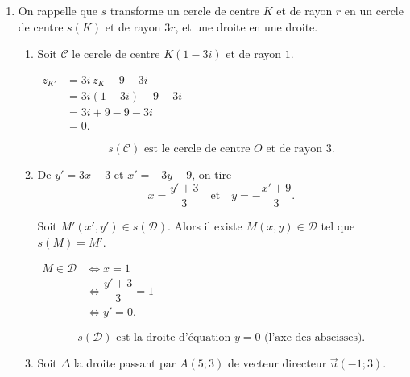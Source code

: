\documentclass[12pt,a4paper]{article}
\begin{document}
\begin{enumerate}
    Par identification des parties réelle et imaginaire :

    \[
    \boxed{\left\{
    \begin{aligned}
    x' &= -3y - 9 \\
    y' &= 3x - 3
    \end{aligned}
    \right.}
    \]

    \item On rappelle que $s$ transforme un cercle de centre $K$ et de rayon $r$ en un cercle de centre $s(K)$ et de rayon $3r$, et une droite en une droite.

    \begin{enumerate}

        \item Soit $\mathscr{C}$ le cercle de centre $K(1 - 3i)$ et de rayon $1$.

        $
        \begin{aligned}
        z_{K'} &= 3i\,z_K - 9 - 3i \\[1mm]
               &= 3i(1 - 3i) - 9 - 3i \\[1mm]
               &= 3i + 9 - 9 - 3i \\[1mm]
               &= 0.
        \end{aligned}
        $

        \[
        \boxed{s(\mathscr{C}) \text{ est le cercle de centre } O \text{ et de rayon } 3.}
        \]

        \item De $y' = 3x - 3$ et $x' = -3y - 9$, on tire
        \[
        x = \dfrac{y' + 3}{3}
        \quad \text{et} \quad
        y = -\dfrac{x' + 9}{3}.
        \]

        Soit $M'(x', y') \in s(\mathscr{D})$. Alors il existe $M(x, y) \in \mathscr{D}$ tel que $s(M) = M'$.

        $
        \begin{aligned}
        M \in \mathscr{D} &\iff x = 1 \\[1mm]
                          &\iff \dfrac{y' + 3}{3} = 1 \\[1mm]
                          &\iff y' = 0.
        \end{aligned}
        $

        \[
        \boxed{s(\mathscr{D}) \text{ est la droite d'équation } y = 0 \text{ (l'axe des abscisses).}}
        \]

        \item Soit $\Delta$ la droite passant par $A(5;3)$ de vecteur directeur $\vec{u}(-1;3)$.


\end{enumerate}
\end{enumerate}
\end{document}
